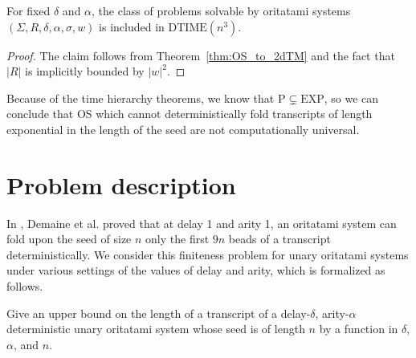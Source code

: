 \documentclass[runningheads]{llncs}
\begin{document}
\begin{corollary}
	For fixed $\delta$ and $\alpha$, the class of problems solvable by oritatami systems $(\Sigma, R, \delta, \alpha, \sigma, w)$ is included in $\mathrm{DTIME}(n^3)$.
\end{corollary}
\begin{proof}
	The claim follows from Theorem~\ref{thm:OS_to_2dTM} and the fact that $|R|$ is implicitly bounded by $|w|^2$.
\end{proof}



Because of the time hierarchy theorems, we know that $\mathrm{P}\subsetneq \mathrm{EXP}$, so we can conclude that OS which cannot deterministically fold transcripts of length exponential in the length of the seed are not computationally universal.

	\section{Problem description}

In \cite{DHOPRSST2018}, Demaine et al. proved that at delay 1 and arity 1, an oritatami system can fold upon the seed of size $n$ only the first $9n$ beads of a transcript deterministically. 
We consider this finiteness problem for unary oritatami systems under various settings of the values of delay and arity, which is formalized as follows. 

\begin{problem}\label{prob:det_unary_length}
Give an upper bound on the length of a transcript of a delay-$\delta$, arity-$\alpha$ deterministic unary oritatami system whose seed is of length $n$ by a function in $\delta$, $\alpha$, and $n$. 
\end{problem}
\end{document}

